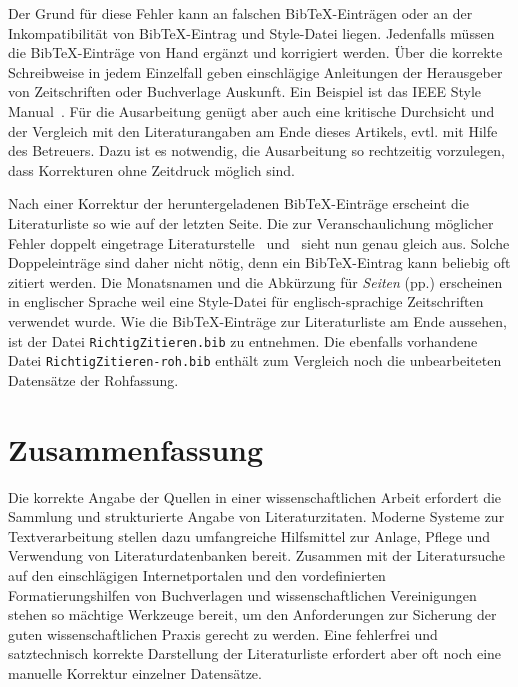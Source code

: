 \documentclass[a4paper, 10pt]{article}
\begin{document}
Der Grund f\"ur diese Fehler kann an falschen BibTeX-Eintr\"agen oder an der Inkompatibilit\"at
von BibTeX-Eintrag und Style-Datei liegen. Jedenfalls m\"ussen die BibTeX-Eintr\"age von Hand
erg\"anzt und korrigiert werden. \"Uber die korrekte Schreibweise in jedem Einzelfall geben
einschl\"agige Anleitungen der Herausgeber von Zeitschriften oder Buchverlage Auskunft. Ein
Beispiel ist das IEEE Style Manual~\cite{IEEE_Style_Manual}.
%
F\"ur die Ausarbeitung gen\"ugt aber auch eine kritische Durchsicht und der
Vergleich mit den Literaturangaben am Ende dieses Artikels, evtl. mit Hilfe des Betreuers. Dazu ist
es notwendig, die Ausarbeitung so rechtzeitig vorzulegen, dass Korrekturen ohne Zeitdruck m\"oglich
sind.

Nach einer Korrektur der heruntergeladenen BibTeX-Eintr\"age erscheint die Literaturliste so wie
auf der letzten Seite. Die zur Veranschaulichung m\"oglicher Fehler doppelt eingetrage
Literaturstelle~\cite{4703235} und~\cite{Li09laplacedistribution} sieht nun genau gleich aus.
Solche Doppeleintr\"age sind daher nicht n\"otig, denn ein BibTeX-Eintrag kann
beliebig oft zitiert werden. Die Monatsnamen und die Abk\"urzung f\"ur \emph{Seiten} (pp.)
erscheinen in englischer Sprache weil eine Style-Datei f\"ur englisch-sprachige Zeitschriften
verwendet wurde.
%
Wie die BibTeX-Eintr\"age zur Literaturliste am Ende aussehen, ist der Datei
\verb+RichtigZitieren.bib+ 
zu entnehmen. Die ebenfalls vorhandene Datei
\verb+RichtigZitieren-roh.bib+ enth\"alt zum Vergleich noch die unbearbeiteten Datens\"atze der
Rohfassung.


\section{Zusammenfassung}

Die korrekte Angabe der Quellen in einer wissenschaftlichen Arbeit erfordert
die Sammlung und strukturierte Angabe von Literaturzitaten. Moderne Systeme zur
Textverarbeitung stellen dazu umfangreiche Hilfsmittel zur Anlage, Pflege
und Verwendung von Literaturdatenbanken bereit. Zusammen mit der Literatursuche
auf den einschl\"agigen Internetportalen und den vordefinierten
Formatierungshilfen von Buchverlagen und wissenschaftlichen Vereinigungen
stehen so m\"achtige Werkzeuge bereit, um den Anforderungen zur Sicherung der
guten wissenschaftlichen Praxis gerecht zu werden. Eine fehlerfrei und satztechnisch korrekte
Darstellung der Literaturliste erfordert aber oft noch eine manuelle Korrektur einzelner
Datens\"atze.


\end{document}
